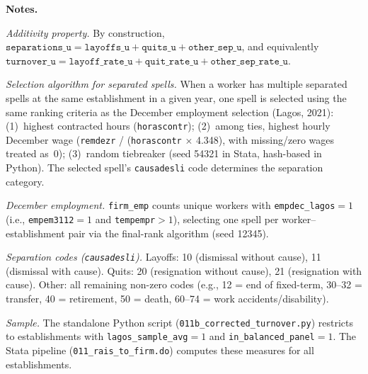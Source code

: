 \begin{table}[htbp]
\vspace{6pt}
\begin{minipage}{0.95\textwidth}
\footnotesize
\textbf{Notes.}

\textit{Additivity property.}
By construction, $\texttt{separations\_u} = \texttt{layoffs\_u} + \texttt{quits\_u} + \texttt{other\_sep\_u}$,
and equivalently $\texttt{turnover\_u} = \texttt{layoff\_rate\_u} + \texttt{quit\_rate\_u} + \texttt{other\_sep\_rate\_u}$.

\textit{Selection algorithm for separated spells.}
When a worker has multiple separated spells at the same establishment in a given year, one spell is selected using the same ranking criteria as the December employment selection (Lagos, 2021):
(1)~highest contracted hours (\texttt{horascontr});
(2)~among ties, highest hourly December wage (\texttt{remdezr} / (\texttt{horascontr} $\times$ 4.348), with missing/zero wages treated as~0);
(3)~random tiebreaker (seed 54321 in Stata, hash-based in Python).
The selected spell's \texttt{causadesli} code determines the separation category.

\textit{December employment.}
\texttt{firm\_emp} counts unique workers with \texttt{empdec\_lagos}$=1$ (i.e., \texttt{empem3112}$=1$ and \texttt{tempempr}$>1$), selecting one spell per worker--establishment pair via the final-rank algorithm (seed 12345).

\textit{Separation codes (\texttt{causadesli}).}
Layoffs: 10 (dismissal without cause), 11 (dismissal with cause).
Quits: 20 (resignation without cause), 21 (resignation with cause).
Other: all remaining non-zero codes (e.g., 12 = end of fixed-term, 30--32 = transfer, 40 = retirement, 50 = death, 60--74 = work accidents/disability).

\textit{Sample.}
The standalone Python script (\texttt{011b\_corrected\_turnover.py}) restricts to establishments with \texttt{lagos\_sample\_avg}$=1$ and \texttt{in\_balanced\_panel}$=1$. The Stata pipeline (\texttt{011\_rais\_to\_firm.do}) computes these measures for all establishments.
\end{minipage}
\end{table}
